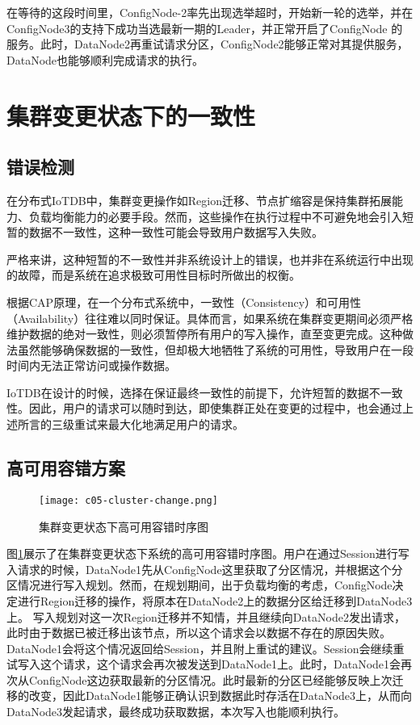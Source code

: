 在等待的这段时间里，ConfigNode-2率先出现选举超时，开始新一轮的选举，并在ConfigNode3的支持下成功当选最新一期的Leader，并正常开启了ConfigNode 的服务。此时，DataNode2再重试请求分区，ConfigNode2能够正常对其提供服务，DataNode也能够顺利完成请求的执行。

\section{集群变更状态下的一致性}

\subsection{错误检测}

在分布式IoTDB中，集群变更操作如Region迁移、节点扩缩容是保持集群拓展能力、负载均衡能力的必要手段。然而，这些操作在执行过程中不可避免地会引入短暂的数据不一致性，这种一致性可能会导致用户数据写入失败。

严格来讲，这种短暂的不一致性并非系统设计上的错误，也并非在系统运行中出现的故障，而是系统在追求极致可用性目标时所做出的权衡。

根据CAP原理\cite{fox1999harvest}，在一个分布式系统中，一致性（Consistency）和可用性（Availability）往往难以同时保证。具体而言，如果系统在集群变更期间必须严格维护数据的绝对一致性，则必须暂停所有用户的写入操作，直至变更完成。这种做法虽然能够确保数据的一致性，但却极大地牺牲了系统的可用性，导致用户在一段时间内无法正常访问或操作数据。

IoTDB在设计的时候，选择在保证最终一致性的前提下，允许短暂的数据不一致性。因此，用户的请求可以随时到达，即使集群正处在变更的过程中，也会通过上述所言的三级重试来最大化地满足用户的请求。

\subsection{高可用容错方案}

\begin{figure}
    \centering
    \texttt{[image: c05-cluster-change.png]}
    \caption{集群变更状态下高可用容错时序图}
    \label{fig:c05-cluster-change}
\end{figure}

图\ref{fig:c05-cluster-change}展示了在集群变更状态下系统的高可用容错时序图。用户在通过Session进行写入请求的时候，DataNode1先从ConfigNode这里获取了分区情况，并根据这个分区情况进行写入规划。然而，在规划期间，出于负载均衡的考虑，ConfigNode决定进行Region迁移的操作，将原本在DataNode2上的数据分区给迁移到DataNode3上。
写入规划对这一次Region迁移并不知情，并且继续向DataNode2发出请求，此时由于数据已被迁移出该节点，所以这个请求会以数据不存在的原因失败。
DataNode1会将这个情况返回给Session，并且附上重试的建议。Session会继续重试写入这个请求，这个请求会再次被发送到DataNode1上。此时，DataNode1会再次从ConfigNode这边获取最新的分区情况。此时最新的分区已经能够反映上次迁移的改变，因此DataNode1能够正确认识到数据此时存活在DataNode3上，从而向DataNode3发起请求，最终成功获取数据，本次写入也能顺利执行。